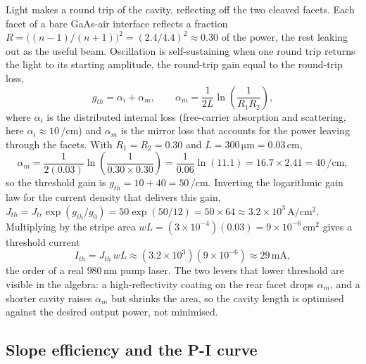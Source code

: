 Light makes a round trip of the cavity, reflecting off the two cleaved
facets. Each facet of a bare GaAs-air interface reflects a fraction
$R = \big((n-1)/(n+1)\big)^{2} = (2.4/4.4)^{2} \approx 0.30$ of the
power, the rest leaking out as the useful beam. Oscillation is
self-sustaining when one round trip returns the light to its starting
amplitude, the round-trip gain equal to the round-trip loss,
\[
g_{th} = \alpha_i + \alpha_m,
\qquad
\alpha_m = \frac{1}{2L}\ln\!\left(\frac{1}{R_1 R_2}\right),
\]
where $\alpha_i$ is the distributed internal loss (free-carrier
absorption and scattering, here $\alpha_i \approx 10\,\si{\per\centi
\meter}$) and $\alpha_m$ is the mirror loss that accounts for the power
leaving through the facets. With $R_1 = R_2 = 0.30$ and $L = 300\,\si{
\micro\meter} = 0.03\,\si{\centi\meter}$,
\[
\alpha_m = \frac{1}{2(0.03)}\ln\!\left(\frac{1}{0.30\times 0.30}\right)
         = \frac{1}{0.06}\ln(11.1)
         = 16.7 \times 2.41
         = 40\,\si{\per\centi\meter},
\]
so the threshold gain is $g_{th} = 10 + 40 = 50\,\si{\per\centi\meter}$.
Inverting the logarithmic gain law for the current density that delivers
this gain, $J_{th} = J_{tr}\exp(g_{th}/g_0) = 50\exp(50/12) = 50\times
64 \approx 3.2\times 10^{3}\,\si{\ampere\per\centi\meter\squared}$.
Multiplying by the stripe area $wL = (3\times 10^{-4})(0.03) =
9\times 10^{-6}\,\si{\centi\meter\squared}$ gives a threshold current
\[
I_{th} = J_{th}\,wL \approx (3.2\times 10^{3})(9\times 10^{-6})
       \approx 29\,\si{\milli\ampere},
\]
the order of a real $980\,\si{\nano\meter}$ pump laser. The two levers
that lower threshold are visible in the algebra: a high-reflectivity
coating on the rear facet drops $\alpha_m$, and a shorter cavity raises
$\alpha_m$ but shrinks the area, so the cavity length is optimised
against the desired output power, not minimised.

\subsection{Slope efficiency and the P-I curve}



